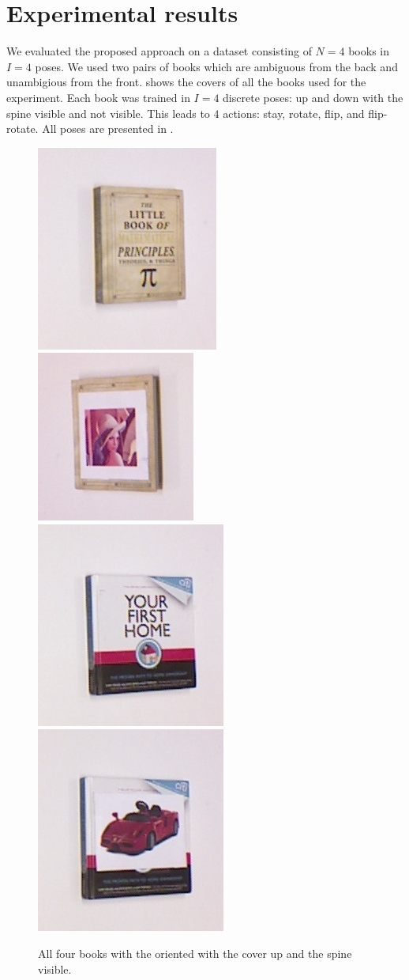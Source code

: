 \section{Experimental results}

    We evaluated the proposed approach on a dataset consisting of $N = 4$ books in $I = 4$ poses. We used two pairs of books which are ambiguous from the back and unambigious from the front.  shows the covers of all the books used for the experiment. Each book was trained in $I = 4$ discrete poses: up and down with the spine visible and not visible. This leads to $4$ actions: stay, rotate, flip, and flip-rotate. All poses are presented in . 
    
    \begin{figure}[h]
        \includegraphics[width = 0.2\columnwidth]{pics/math_cover1_ok.jpg}
        \includegraphics[width = 0.2\columnwidth]{pics/math_cover2_ok.jpg}
        \includegraphics[width = 0.2\columnwidth]{pics/first_cover1.jpg}
        \includegraphics[width = 0.2\columnwidth]{pics/first_cover2.jpg}
        \caption{All four books with the oriented with the cover up and the spine visible.}
        \label{fig:object_dataset} %
    \end{figure}

